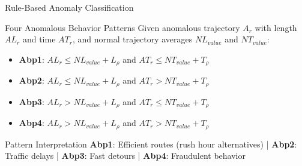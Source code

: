 \documentclass[aspectratio=169,xcolor={dvipsnames}]{beamer}
\begin{document}
\begin{frame}{Rule-Based Anomaly Classification}
  \begin{block}{Four Anomalous Behavior Patterns \cite{wangDetectingAnomalousTrajectories2018}}
    \small
    Given anomalous trajectory $A_r$ with length $AL_r$ and time $AT_r$, and normal trajectory averages $NL_{value}$ and $NT_{value}$:
    
    \vspace{0.5em}
    \begin{itemize}
      \item \textbf{Abp1}: $AL_r \leq NL_{value} + L_\rho$ and $AT_r \leq NT_{value} + T_\rho$
      \item \textbf{Abp2}: $AL_r \leq NL_{value} + L_\rho$ and $AT_r > NT_{value} + T_\rho$  
      \item \textbf{Abp3}: $AL_r > NL_{value} + L_\rho$ and $AT_r \leq NT_{value} + T_\rho$
      \item \textbf{Abp4}: $AL_r > NL_{value} + L_\rho$ and $AT_r > NT_{value} + T_\rho$
    \end{itemize}
  \end{block}
  
  \vspace{0.5em}
  \begin{alertblock}{Pattern Interpretation}
    \footnotesize
    \textbf{Abp1}: Efficient routes (rush hour alternatives) | \textbf{Abp2}: Traffic delays | \textbf{Abp3}: Fast detours | \textbf{Abp4}: Fraudulent behavior
  \end{alertblock}
\end{frame}
\end{document}
